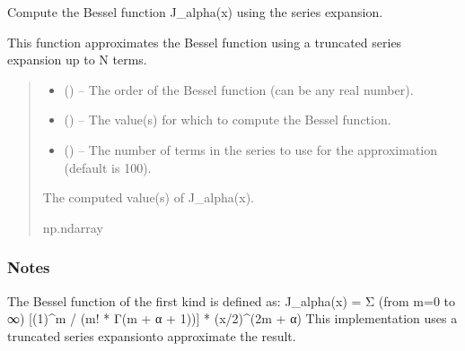 \documentclass[a4paper,10pt,oneside,english]{sphinxmanual}
\begin{document}
\begin{fulllineitems}
\label{\detokenize{acsefunctions:acsefunctions.functions.bessel}}
\pysigstartsignatures
\pysiglinewithargsret
{}
{\sphinxparamcomma {}\sphinxparamcomma {}}
{}
\pysigstopsignatures
\sphinxAtStartPar
Compute the Bessel function J\_alpha(x) using the series expansion.

\sphinxAtStartPar
This function approximates the Bessel function using a truncated
series expansion
up to N terms.
\begin{quote}\begin{description}
\begin{itemize}
\item {} 
\sphinxAtStartPar
{} () – The order of the Bessel function (can be any real number).

\item {} 
\sphinxAtStartPar
{} () – The value(s) for which to compute the Bessel function.

\item {} 
\sphinxAtStartPar
{} (\sphinxstyleliteralemphasis{\sphinxupquote{, }}) – The number of terms in the series to use for the approximation
(default is 100).

\end{itemize}

\sphinxAtStartPar
The computed value(s) of J\_alpha(x).

\sphinxAtStartPar
np.ndarray

\end{description}\end{quote}
\subsubsection*{Notes}

\sphinxAtStartPar
The Bessel function of the first kind is defined as:
J\_alpha(x) = Σ (from m=0 to ∞) {[}(\sphinxhyphen{}1)\textasciicircum{}m / (m! * Γ(m + α + 1)){]}
* (x/2)\textasciicircum{}(2m + α)
This implementation uses a truncated series expansionto approximate the
result.

\end{fulllineitems}
\end{document}
